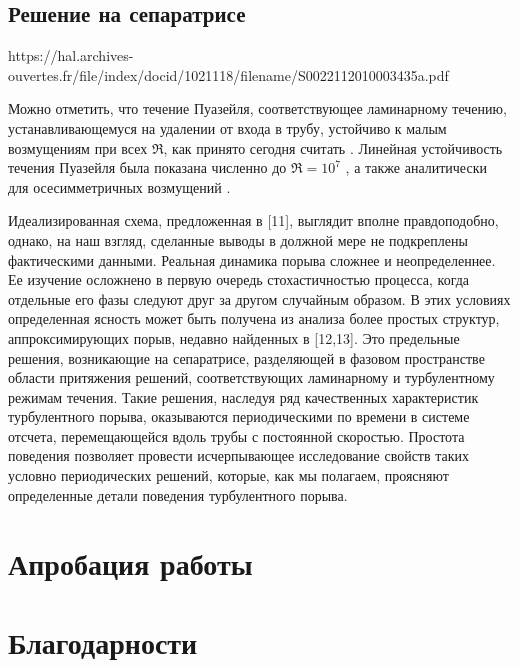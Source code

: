	\subsection{Решение на сепаратрисе}


https://hal.archives-ouvertes.fr/file/index/docid/1021118/filename/S0022112010003435a.pdf

Можно отметить, что течение Пуазейля, соответствующее ламинарному течению, устанавливающемуся на удалении от входа в трубу, устойчиво к малым возмущениям при всех $\Re$, как принято сегодня считать \cite{Kerswell2005}. Линейная устойчивость течения Пуазейля была показана численно до $\Re=10^7$ \cite{Meseguer2003}, а также аналитически для осесимметричных возмущений \cite{Salwen1980}. 

Идеализированная схема, предложенная в [11], выглядит вполне правдоподобно, однако, на наш взгляд, сделанные выводы в должной мере не подкреплены фактическими данными. Реальная динамика порыва сложнее и неопределеннее. Ее изучение осложнено в первую очередь стохастичностью процесса, когда отдельные его фазы следуют друг за другом случайным образом. В этих условиях определенная ясность может быть получена из анализа более простых структур, аппроксимирующих порыв, недавно найденных в [12,13]. Это предельные решения, возникающие на сепаратрисе, разделяющей в фазовом пространстве области притяжения решений, соответствующих ламинарному и турбулентному режимам течения. Такие решения, наследуя ряд качественных характеристик турбулентного порыва, оказываются периодическими по времени в системе отсчета, перемещающейся вдоль трубы с постоянной скоростью. Простота поведения позволяет провести исчерпывающее исследование свойств таких условно периодических решений, которые, как мы полагаем, проясняют определенные детали поведения турбулентного порыва.

\section{Апробация работы}

\section{Благодарности}


